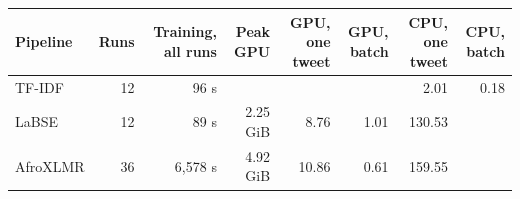 \begin{tabular}{lrrrrrrr}
\toprule
Pipeline & Runs & Training, all runs & Peak GPU & GPU, one tweet & GPU, batch & CPU, one tweet & CPU, batch \\
\midrule
TF-IDF & 12 & 96 s &  &  &  & 2.01 & 0.18 \\
LaBSE & 12 & 89 s & 2.25 GiB & 8.76 & 1.01 & 130.53 &  \\
AfroXLMR & 36 & 6,578 s & 4.92 GiB & 10.86 & 0.61 & 159.55 &  \\
\bottomrule
\end{tabular}
